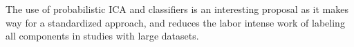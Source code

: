 The use of probabilistic ICA and classifiers is an interesting proposal as it makes way for a standardized approach, and reduces the labor intense work of labeling all components in studies with large datasets.    
